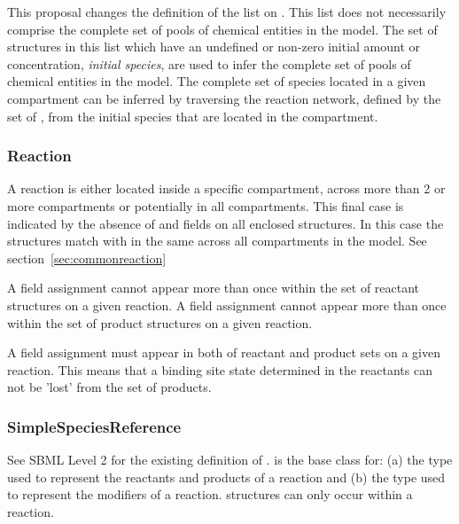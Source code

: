 \documentclass{cekarticle}
\begin{document}
This proposal changes the definition of the  list on .
This list does not necessarily comprise the complete set of pools of chemical entities in the model.
The set of  structures in this list which have an undefined or non-zero
initial amount or concentration, \emph{initial species}, are used to infer the complete set
of pools of chemical entities in the model.  The complete set of species located in a given
compartment can be inferred by traversing the reaction
network, defined by the set of , from the initial species that are located in
the compartment.

\subsubsection{Reaction}

A reaction
is either located inside a specific compartment, across more than 2 or more compartments or
 potentially in all compartments.  This final case is indicated by the absence of 
 and  fields on all enclosed 
structures. In this case the  structures match with 
in the same  across all compartments in the model.
See section~\ref{sec:commonreaction}

A   field assignment cannot appear more than once within the set of
reactant  structures on a given reaction.
A   field assignment cannot appear more than once within the set of
product  structures on a given reaction.

A   field assignment must appear in both
of reactant and product  sets on a given reaction.  This means that a 
binding site state determined in the reactants can not be 'lost' from the set of products.

\subsubsection{SimpleSpeciesReference}

See SBML Level 2 for the existing definition of .
 is the base class for: (a)  the type used
to represent the reactants and products of a reaction and (b)  the
type used to represent the modifiers of a reaction.   structures
can only occur within a reaction.
\end{document}
